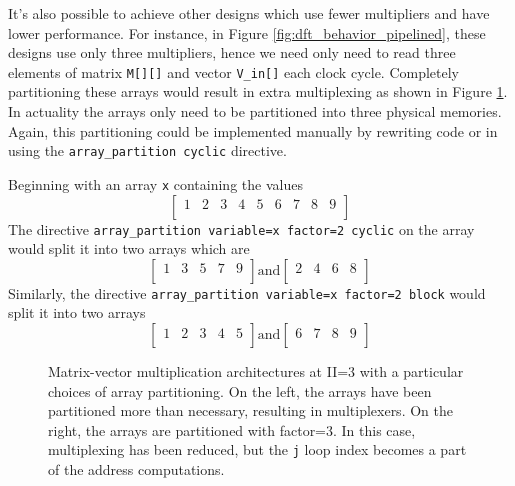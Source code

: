 It's also possible to achieve other designs which use fewer multipliers and have lower performance.   For instance, in Figure \ref{fig:dft_behavior_pipelined}, these designs use only three multipliers, hence we need only need to read three elements of matrix \lstinline|M[][]| and vector \lstinline|V_in[]| each clock cycle. Completely partitioning these arrays would result in extra multiplexing as shown in Figure \ref{fig:matrix_vector_partition_factor}.  In actuality the arrays only need to be partitioned into three physical memories.  Again, this partitioning could be implemented manually by rewriting code or in \VHLS using the \lstinline|array_partition cyclic| directive.

\begin{aside}
Beginning with an array \lstinline|x| containing the values \[ 
\begin{bmatrix} 
1 & 2 & 3 & 4 & 5 & 6 & 7 & 8 & 9\\
\end{bmatrix}
\]
The directive \lstinline{array_partition variable=x factor=2 cyclic} on the array would split it into two arrays which are 
\[\begin{bmatrix}
1 & 3 & 5 & 7 & 9\\
\end{bmatrix} \text{and} 
\begin{bmatrix}
2 & 4 & 6 & 8 \\
\end{bmatrix}
\]
Similarly, the directive \lstinline{array_partition variable=x factor=2 block} would split it into two arrays
\[\begin{bmatrix}
1 & 2 & 3 & 4 & 5\\
\end{bmatrix} \text{and} 
\begin{bmatrix}
6 & 7 & 8 & 9 \\
\end{bmatrix}
\]
\end{aside}

\begin{figure}
\begin{tiny}

\end{tiny}
\caption{Matrix-vector multiplication architectures at II=3 with a particular choices of array partitioning.  On the left, the arrays have been partitioned more than necessary, resulting in multiplexers.  On the right, the arrays are partitioned with factor=3. In this case, multiplexing has been reduced, but the \lstinline|j| loop index becomes a part of the address computations.}
\label{fig:matrix_vector_partition_factor}
\end{figure}

